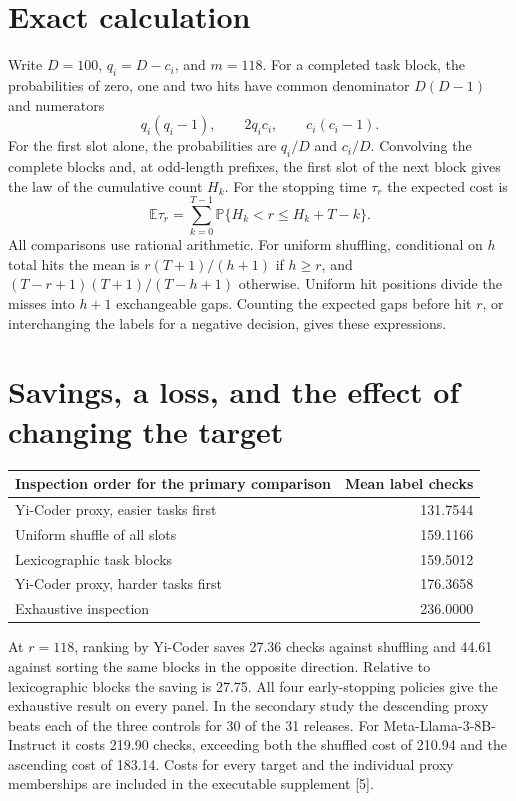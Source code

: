 \documentclass[10pt,a4paper]{article}
\newcommand{\E}{\mathbb E}
\newcommand{\Prb}{\mathbb P}
\begin{document}
\section{Exact calculation}
Write $D=100$, $q_i=D-c_i$, and $m=118$. For a completed task block, the probabilities of zero, one and two hits have common denominator $D(D-1)$ and numerators
\[
q_i(q_i-1),\qquad 2q_ic_i,\qquad c_i(c_i-1).
\]
For the first slot alone, the probabilities are $q_i/D$ and $c_i/D$. Convolving the complete blocks and, at odd-length prefixes, the first slot of the next block gives the law of the cumulative count $H_k$. For the stopping time $\tau_r$ the expected cost is
\[
\E\tau_r=\sum_{k=0}^{T-1}\Prb\{H_k<r\le H_k+T-k\}.
\]
All comparisons use rational arithmetic. For uniform shuffling, conditional on $h$ total hits the mean is $r(T+1)/(h+1)$ if $h\ge r$, and $(T-r+1)(T+1)/(T-h+1)$ otherwise. Uniform hit positions divide the misses into $h+1$ exchangeable gaps. Counting the expected gaps before hit $r$, or interchanging the labels for a negative decision, gives these expressions.

\newpage
\section{Savings, a loss, and the effect of changing the target}
\begin{center}
\begin{tabular}{@{}lr@{}}
\toprule
Inspection order for the primary comparison & Mean label checks\\
\midrule
Yi-Coder proxy, easier tasks first & 131.7544\\
Uniform shuffle of all slots & 159.1166\\
Lexicographic task blocks & 159.5012\\
Yi-Coder proxy, harder tasks first & 176.3658\\
Exhaustive inspection & 236.0000\\
\bottomrule
\end{tabular}
\end{center}
At $r=118$, ranking by Yi-Coder saves 27.36 checks against shuffling and 44.61 against sorting the same blocks in the opposite direction. Relative to lexicographic blocks the saving is 27.75. All four early-stopping policies give the exhaustive result on every panel. In the secondary study the descending proxy beats each of the three controls for 30 of the 31 releases. For Meta-Llama-3-8B-Instruct it costs 219.90 checks, exceeding both the shuffled cost of 210.94 and the ascending cost of 183.14. Costs for every target and the individual proxy memberships are included in the executable supplement [5].
\end{document}
